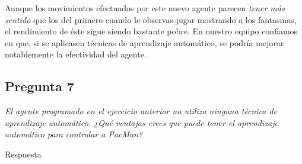 \documentclass[12pt]{article}
\begin{document}
Aunque los movimientos efectuados por este nuevo agente parecen \emph{tener más
sentido} que los del primero cuando le observas jugar mostrando a los fantasmas,
el rendimiento de éste sigue siendo bastante pobre. En nuestro equipo confiamos
en que, si se aplicasen técnicas de aprendizaje automático, se podría mejorar
notablemente la efectividad del agente.

\newpage
\begin{center}
\subsection{Pregunta 7}

\emph{El agente programado en el ejercicio anterior no utiliza ninguna técnica
de aprendizaje automático. ¿Qué ventajas crees que puede tener el aprendizaje
automático para controlar a PacMan?}
\end{center}
Respuesta
\end{document}
